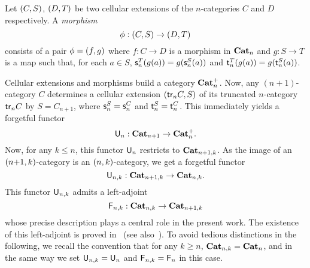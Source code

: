 Let $(C,S)$, $(D,T)$ be two cellular extensions of the
$n$-categories $C$ and $D$ respectively.  A {\em morphism}
 \[\phi:(C,S)\to(D,T)\]
 consists of a pair $\phi=(f,g)$ where $f:C\to D$ is a morphism in
 $\mathbf{Cat}_{n}$ and $g:S\to T$ is a map such that, for each $a\in S$, $\mathsf{s}_{n}^T(g(a))=g(\mathsf{s}_{n}^S(a))$ and $\mathsf{t}_{n}^T(g(a))=g(\mathsf{t}_{n}^S(a))$.

 Cellular extensions and morphisms build a category $\mathbf{Cat}_{n}^{+}$. Now,
 any $(n{+}1)$-category $C$ determines a cellular extension $(\mathsf{tr}_{n} C,S)$ of its truncated $n$-category $\mathsf{tr}_{n} C$ by
 $S=C_{n+1}$, where $\mathsf{s}_{n}^S=\mathsf{s}_{n}^C$ and $\mathsf{t}_{n}^S=\mathsf{t}_{n}^C$.
 This immediately yields a forgetful functor
 \[\mathsf{U}_{n}:\mathbf{Cat}_{n+1}\to \mathbf{Cat}_{n}^{+}.\]
Now, for any $k\leq n$, this functor $\mathsf{U}_{n}$ restricts to
$\mathbf{Cat}_{n+1,k}$. As the image of an $(n{+}1,k)$-category is an
$(n,k)$-category, we get a forgetful functor
\[\mathsf{U}_{n,k}:\mathbf{Cat}_{n+1,k}\to \mathbf{Cat}_{n,k}.\]
This functor $\mathsf{U}_{n,k}$ admits a left-adjoint
\[\mathsf{F}_{n,k}:\mathbf{Cat}_{n,k}\to \mathbf{Cat}_{n+1,k}\]
whose precise description plays a central role in the present
work. The existence of this left-adjoint is proved
in~\cite{batanin:comfmg} (see also~\cite[Ch.18]{abgmmm:polybk}). To
avoid tedious distinctions in the following, we recall the convention that
for any $k\geq n$, $\mathbf{Cat}_{n,k}=\mathbf{Cat}_{n}$, and in the same way we set
$\mathsf{U}_{n,k}=\mathsf{U}_{n}$ and $\mathsf{F}_{n,k}=\mathsf{F}_{n}$ in this case.

